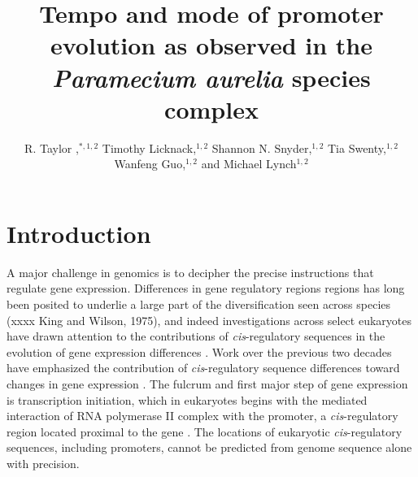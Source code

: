 \documentclass[nogrid]{MBE}%
\begin{document}
\title{Tempo and mode of promoter evolution as observed in the \textit{Paramecium aurelia} species complex}

\author[Raborn et al.]{R. Taylor ,$^{\ast,1,2}$ Timothy Licknack,$^{1,2}$ Shannon N. Snyder,$^{1,2}$ Tia Swenty,$^{1,2}$ Wanfeng Guo,$^{1,2}$ and Michael Lynch$^{1,2}$}

\address{$^{1}$Biodesign Institute Center for the Mechanisms of Evolution\\
$^{2}$School of Life Sciences\\
Arizona State University, 797 E. Tyler Street, Tempe, AZ 85281}







\maketitle


\section{{Introduction}\label{sec:Intro}}

A major challenge in genomics is to decipher the precise instructions that regulate gene expression. Differences in gene regulatory regions regions has long been posited to underlie a large part of the diversification seen across species (xxxx King and Wilson, 1975), and indeed investigations across select eukaryotes have drawn attention to the contributions of \textit{cis}-regulatory sequences in the evolution of gene expression differences \citep{Wittkopp:2008ki, Wittkopp:2011bc, Siepel:2014hd}. Work over the previous two decades have emphasized the contribution of \textit{cis}-regulatory sequence differences toward changes in gene expression \citep{Wittkopp:2004cy}. The fulcrum and first major step of gene expression is transcription initiation, which in eukaryotes begins with the mediated interaction of RNA polymerase II complex with the promoter, a \textit{cis}-regulatory region located proximal to the gene \citep{Kadonaga:2011gz}. The locations of eukaryotic \textit{cis}-regulatory sequences, including promoters, cannot be predicted from genome sequence alone with precision.\\
\end{document}
